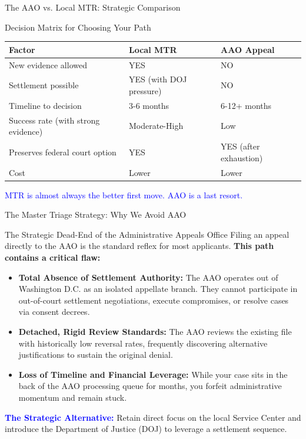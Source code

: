 \documentclass[11pt]{beamer}
\begin{document}
	\begin{frame}{The AAO vs. Local MTR: Strategic Comparison}
		\scriptsize
		\begin{block}{Decision Matrix for Choosing Your Path}
			\centering
			\begin{tabular}{|p{4cm}|p{3cm}|p{3cm}|}
				\hline
				\textbf{Factor} & \textbf{Local MTR} & \textbf{AAO Appeal} \\
				\hline
				New evidence allowed & YES & NO \\
				\hline
				Settlement possible & YES (with DOJ pressure) & NO \\
				\hline
				Timeline to decision & 3-6 months & 6-12+ months \\
				\hline
				Success rate (with strong evidence) & Moderate-High & Low \\
				\hline
				Preserves federal court option & YES & YES (after exhaustion) \\
				\hline
				Cost & Lower & Lower \\
				\hline
			\end{tabular}
			\vspace{0.2cm}
			\textcolor{blue}{MTR is almost always the better first move. AAO is a last resort.}
		\end{block}
	\end{frame}
	
	
	\begin{frame}{The Master Triage Strategy: Why We Avoid AAO}
		\scriptsize
		\begin{block}{The Strategic Dead-End of the Administrative Appeals Office}
			Filing an appeal directly to the AAO is the standard reflex for most applicants. \textbf{This path contains a critical flaw:}
			\begin{itemize}
				\item \textbf{Total Absence of Settlement Authority:} The AAO operates out of Washington D.C. as an isolated appellate branch. They cannot participate in out-of-court settlement negotiations, execute compromises, or resolve cases via consent decrees.
				\item \textbf{Detached, Rigid Review Standards:} The AAO reviews the existing file with historically low reversal rates, frequently discovering alternative justifications to sustain the original denial.
				\item \textbf{Loss of Timeline and Financial Leverage:} While your case sits in the back of the AAO processing queue for months, you forfeit administrative momentum and remain stuck.
			\end{itemize}
			\textcolor{blue}{\textbf{The Strategic Alternative:}} Retain direct focus on the local Service Center and introduce the Department of Justice (DOJ) to leverage a settlement sequence.
		\end{block}
	\end{frame}
	
\end{document}
